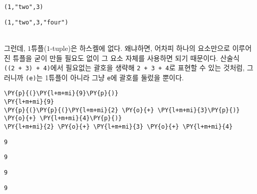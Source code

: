    
    
    \begin{Verbatim}[commandchars=\\\{\}]
(1,"two",3)
    \end{Verbatim}

    
    
    \begin{Verbatim}[commandchars=\\\{\}]
(1,"two",3,"four")
    \end{Verbatim}

    ~\\[-3ex]
    그런데, \(1\)튜플(\(1\)-tuple)은 하스켈에 없다. 왜냐하면, 어차피 하나의
요소만으로 이루어진 튜플을 굳이 만들 필요도 없이 그 요소 자체를 사용하면
되기 때문이다. 산술식 \texttt{((2\ +\ 3)\ +\ 4)}에서 필요없는 괄호을
생략해 \texttt{2\ +\ 3\ +\ 4}로 표현할 수 있는 것처럼, 그러니까
\texttt{(e)}는 1튜플이 아니라 그냥 \texttt{e}에 괄호를 둘렀을 뿐이다.

    \begin{tcolorbox}[breakable, size=fbox, boxrule=1pt, pad at break*=1mm,colback=cellbackground, colframe=cellborder, top=.75ex]
\begin{Verbatim}[commandchars=\\\{\}]
\PY{p}{(}\PY{l+m+mi}{9}\PY{p}{)}
\PY{l+m+mi}{9}
\PY{p}{(}\PY{p}{(}\PY{l+m+mi}{2} \PY{o}{+} \PY{l+m+mi}{3}\PY{p}{)} \PY{o}{+} \PY{l+m+mi}{4}\PY{p}{)}
\PY{l+m+mi}{2} \PY{o}{+} \PY{l+m+mi}{3} \PY{o}{+} \PY{l+m+mi}{4}
\end{Verbatim}
\end{tcolorbox}

    
    \begin{Verbatim}[commandchars=\\\{\}]
9
    \end{Verbatim}

    
    
    \begin{Verbatim}[commandchars=\\\{\}]
9
    \end{Verbatim}

    
    
    \begin{Verbatim}[commandchars=\\\{\}]
9
    \end{Verbatim}

    
    
    \begin{Verbatim}[commandchars=\\\{\}]
9
    \end{Verbatim}

